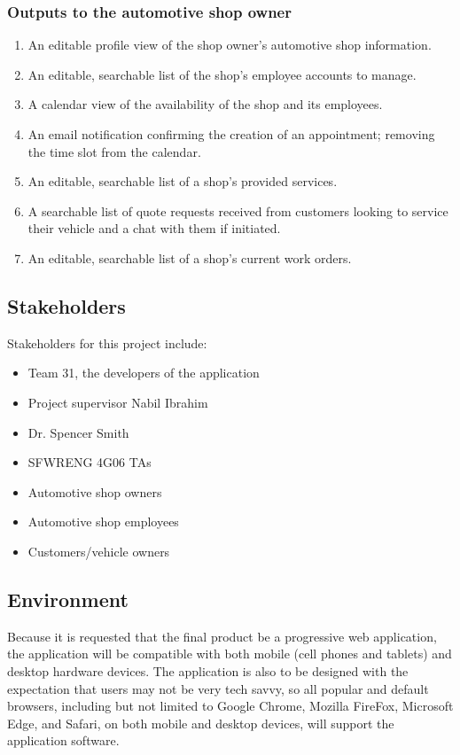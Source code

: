 \documentclass{article}
\begin{document}
\subsubsection{Outputs to the automotive shop owner}
\begin{enumerate}
    \item An editable profile view of the shop owner's automotive shop information.
    \item An editable, searchable list of the shop's employee accounts to manage.
    \item A calendar view of the availability of the shop and its employees.
    \item An email notification confirming the creation of an appointment; removing the time slot from the calendar.
    \item An editable, searchable list of a shop's provided services.
    \item A searchable list of quote requests received from customers looking to service their vehicle and a chat with them if initiated.
    \item An editable, searchable list of a shop's current work orders.
\end{enumerate}

\subsection{Stakeholders}

Stakeholders for this project include:
\begin{itemize}
    \item Team 31, the developers of the application
    \item Project supervisor Nabil Ibrahim
    \item Dr. Spencer Smith
    \item SFWRENG 4G06 TAs
    \item Automotive shop owners
    \item Automotive shop employees
    \item Customers/vehicle owners
\end{itemize}

\subsection{Environment}


\noindent Because it is requested that the final product be a progressive web
application, the application will be compatible with both mobile (cell phones
and tablets) and desktop hardware devices. The application is also to be
designed with the expectation that users may not be very tech savvy, so all
popular and default browsers, including but not limited to Google Chrome,
Mozilla FireFox, Microsoft Edge, and Safari, on both mobile and desktop
devices, will support the application software.\\
\end{document}
